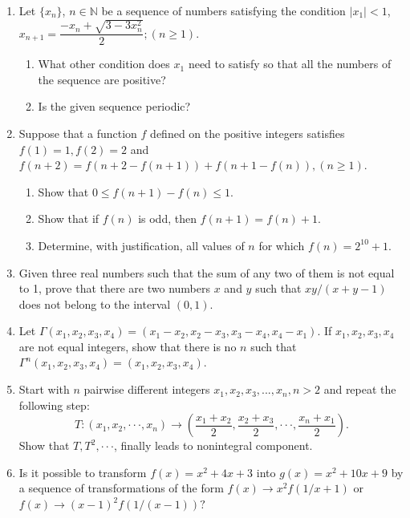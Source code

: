 \documentclass[12pt]{scrartcl}
\begin{document}
\begin{enumerate}
    \item Let $\{x_{n}\}$, $n\in\mathbb{N}$ be a sequence of numbers satisfying the condition 
    $|x_{1}|<1$, $x_{n+1}=\dfrac{-x_{n}+\sqrt{3-3x_{n}^{2}}}{2}; (n\ge1)$.
    \begin{enumerate}
        \item[(a)] What other condition does $x_{1}$ need to satisfy so that all the numbers of the sequence are positive?
        \item[(b)] Is the given sequence periodic?
    \end{enumerate}
    
    \item Suppose that a function $f$ defined on the positive integers satisfies $f(1)=1, f(2)=2$ and $f(n+2)=f(n+2-f(n+1))+f(n+1-f(n)), (n\ge1)$.
    \begin{enumerate}
        \item[(a)] Show that $0\le f(n+1)-f(n)\le1$.
        \item[(b)] Show that if $f(n)$ is odd, then $f(n+1)=f(n)+1$.
        \item[(c)] Determine, with justification, all values of $n$ for which $f(n)=2^{10}+1.$
    \end{enumerate}

    \item Given three real numbers such that the sum of any two of them is not equal to 1, prove that there are two numbers $x$ and $y$ such that $xy/(x+y-1)$ does not belong to the interval $(0, 1)$.

    \item Let $\Gamma(x_{1},x_{2},x_{3},x_{4})=(x_{1}-x_{2},x_{2}-x_{3},x_{3}-x_{4},x_{4}-x_{1})$. If $x_{1}, x_{2}, x_{3}, x_{4}$ are not equal integers, show that there is no $n$ such that $\Gamma^{n}(x_{1},x_{2},x_{3},x_{4})=(x_{1},x_{2},x_{3},x_{4})$.

    \item Start with $n$ pairwise different integers $x_{1},x_{2},x_{3},...,x_{n},n>2$ and repeat the following step: 
    $$T:(x_{1},x_{2},\cdot\cdot\cdot,x_{n})\rightarrow\left(\dfrac{x_{1}+x_{2}}{2},\dfrac{x_{2}+x_{3}}{2},\cdot\cdot\cdot,\dfrac{x_{n}+x_{1}}{2}\right).$$ 
    Show that $T,T^{2},\cdot\cdot\cdot$, finally leads to nonintegral component.

    \item Is it possible to transform $f(x)=x^{2}+4x+3$ into $g(x)=x^{2}+10x+9$ by a sequence of transformations of the form $f(x)\rightarrow x^{2}f(1/x+1)$ or $f(x)\rightarrow(x-1)^{2}f(1/(x-1))?$


\end{enumerate}
\end{document}
